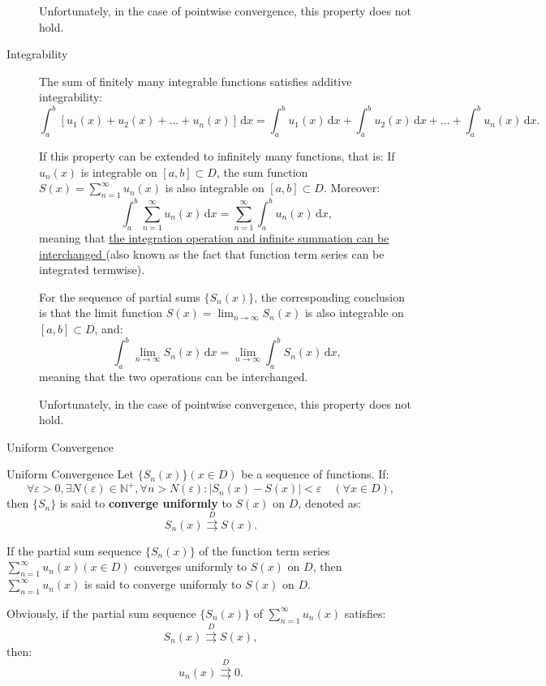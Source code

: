 \documentclass[11pt]{../../TexTemplate/elegantbook}
\begin{document}
\begin{description}
    Unfortunately, in the case of pointwise convergence, this property \textcolor{red!70}{does not hold}.


    \item[Integrability]
    The sum of finitely many integrable functions satisfies additive integrability:
    \[
    \int_a^b [u_1(x) + u_2(x) + \dots + u_n(x)] \, \mathrm{d}x 
    = \int_a^b u_1(x) \, \mathrm{d}x + \int_a^b u_2(x) \, \mathrm{d}x + \dots + \int_a^b u_n(x) \, \mathrm{d}x.
    \]

    If this property can be extended to infinitely many functions, that is:
    If \( u_n(x) \) is integrable on \( [a, b] \subset D \), 
    the sum function \( S(x) = \sum_{n=1}^\infty u_n(x) \) is also integrable on \( [a, b] \subset D \). Moreover:
    \[
    \int_a^b \sum_{n=1}^\infty u_n(x) \, \mathrm{d}x = \sum_{n=1}^\infty \int_a^b u_n(x) \, \mathrm{d}x,
    \]
    meaning that \underline{the integration operation and infinite summation can be interchanged }
    (also known as the fact that function term series can be integrated termwise).

    For the sequence of partial sums \( \{ S_n(x) \} \), 
    the corresponding conclusion is that the limit function \( S(x) = \lim_{n \to \infty} S_n(x) \) is also integrable on \( [a, b] \subset D \), and:
    \[
    \int_a^b \lim_{n \to \infty} S_n(x) \, \mathrm{d}x = \lim_{n \to \infty} \int_a^b S_n(x) \, \mathrm{d}x,
    \]
    meaning that the two operations can be interchanged.

    Unfortunately, in the case of pointwise convergence, this property \textcolor{red!70}{does not hold}.
\end{description}


\begin{leftbarTitle}{Uniform Convergence}\end{leftbarTitle}
\begin{definition}{Uniform Convergence}
    Let \( \{ S_n(x) \} (x \in D) \) be a sequence of functions. If:
    \[
    \forall \varepsilon > 0, \exists N(\varepsilon) \in \mathbb{N}^+, \forall n > N(\varepsilon): 
    |S_n(x) - S(x)| < \varepsilon \quad (\forall x \in D),
    \]
    then \( \{ S_n \} \) is said to \textbf{converge uniformly} to \( S(x) \) on \( D \), denoted as:
    \[
    S_n(x) \mathop{\rightrightarrows}\limits^{D} S(x).
    \]

    If the partial sum sequence \( \{ S_n(x) \} \) of the function term series 
    \( \sum_{n=1}^\infty u_n(x) (x \in D) \) converges uniformly to \( S(x) \) on \( D \), 
    then \( \sum_{n=1}^\infty u_n(x) \) is said to converge uniformly to \( S(x) \) on \( D \).
\end{definition}
Obviously, if the partial sum sequence \( \{ S_n(x) \} \) of \( \sum_{n=1}^\infty u_n(x) \) satisfies:
\[
S_n(x) \mathop{\rightrightarrows}\limits^{D} S(x),
\]
then:
\[
u_n(x) \mathop{\rightrightarrows}\limits^{D} 0.
\]
\end{document}
